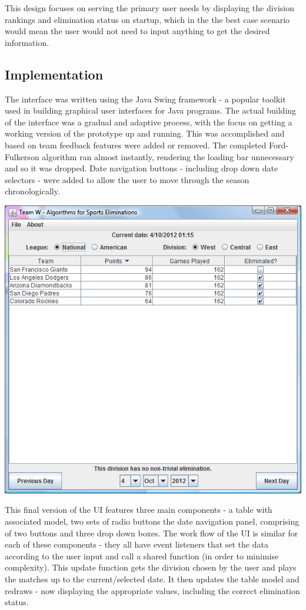 This design focuses on serving the primary user needs by displaying the division 
rankings and elimination status on startup, which in the the best case scenario 
would mean the user would not need to input anything to get the desired information.

\subsection{Implementation}
The interface was written using the Java Swing framework - a popular toolkit used in
building graphical user interfaces for Java programs. The actual building of the interface
was a gradual and adaptive process, with the focus on getting a working version of the 
prototype up and running. This was accomplished and based on team feedback features were added
or removed. The completed Ford-Fulkerson algorithm ran almost instantly, rendering the loading 
bar unnecessary and so it was dropped. Date navigation buttons - including drop down date selectors -
were added to allow the user to move through the season chronologically. 

\includegraphics[width=\linewidth,keepaspectratio]
{images/finalDesktopUI.png}

This final version of the UI features three main components - a table with associated model, 
two sets of radio buttons the date navigation panel, comprising of two buttons and three
drop down boxes. The work flow of the UI is similar for each of these components - they all 
have event listeners that set the data according to the user input and call a shared function 
(in order to minimise complexity). This update function gets the division chosen
by the user and plays the matches up to the current/selected date. It then updates the table 
model and redraws - now displaying the appropriate values, including the correct elimination status.

